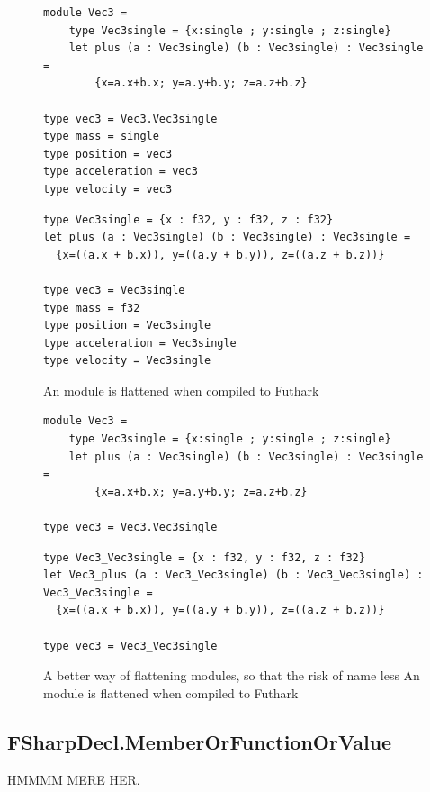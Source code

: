 \begin{figure}[H]
  \centering
\begin{verbatim}
module Vec3 =
    type Vec3single = {x:single ; y:single ; z:single}
    let plus (a : Vec3single) (b : Vec3single) : Vec3single =
        {x=a.x+b.x; y=a.y+b.y; z=a.z+b.z}
            
type vec3 = Vec3.Vec3single
type mass = single
type position = vec3
type acceleration = vec3
type velocity = vec3
\end{verbatim}

\begin{lstlisting}[language=Futhark]
type Vec3single = {x : f32, y : f32, z : f32}
let plus (a : Vec3single) (b : Vec3single) : Vec3single =
  {x=((a.x + b.x)), y=((a.y + b.y)), z=((a.z + b.z))}

type vec3 = Vec3single
type mass = f32
type position = Vec3single
type acceleration = Vec3single
type velocity = Vec3single
\end{lstlisting}
  \caption{An \fshark{} module is flattened when compiled to Futhark}
  \label{fig:moduleflattening}
\end{figure}

  
\begin{figure}[H]
  \centering
\begin{verbatim}
module Vec3 =
    type Vec3single = {x:single ; y:single ; z:single}
    let plus (a : Vec3single) (b : Vec3single) : Vec3single =
        {x=a.x+b.x; y=a.y+b.y; z=a.z+b.z}
            
type vec3 = Vec3.Vec3single
\end{verbatim}

\begin{lstlisting}[language=Futhark]
type Vec3_Vec3single = {x : f32, y : f32, z : f32}
let Vec3_plus (a : Vec3_Vec3single) (b : Vec3_Vec3single) : Vec3_Vec3single =
  {x=((a.x + b.x)), y=((a.y + b.y)), z=((a.z + b.z))}

type vec3 = Vec3_Vec3single
\end{lstlisting}
  \caption{A better way of flattening modules, so that the risk of name
    less An \fshark{} module is flattened when compiled to Futhark}
  \label{fig:moduleflattening'}
\end{figure}

\subsection{FSharpDecl.MemberOrFunctionOrValue}
HMMMM MERE HER.

